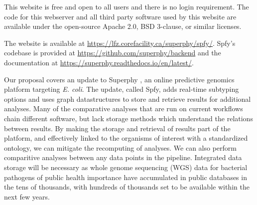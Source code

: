 


This website is free and open to all users and there is no login requirement. The code for this webserver and all third party software used by this website are available under the open-source Apache 2.0, BSD 3-clause, or similar licenses.

The website is available at \url{https://lfz.corefacility.ca/superphy/spfy/}. Spfy's codebase is provided at \url{https://github.com/superphy/backend} and the documentation at \url{https://superphy.readthedocs.io/en/latest/}.

Our proposal covers an update to Superphy \citep{whiteside2016superphy}, an online predictive genomics platform targeting \textit{E. coli}.
The update, called Spfy, adds real-time subtyping options and uses graph datastructures to store and retrieve results for additional analyses.
Many of the comparative analyses that are run on current workflows chain different software, but lack storage methods which understand the relations between results.
By making the storage and retrieval of results part of the platform, and effectively linked to the organisms of interest with a standardized ontology, we can mitigate the recomputing of analyses. We can also perform comparitive analyses between any data points in the pipeline.
Integrated data storage will be necessary as whole genome sequencing (WGS) data for bacterial pathogens of public health importance have accumulated in public databases in the tens of thousands, with hundreds of thousands set to be available within the next few years.

